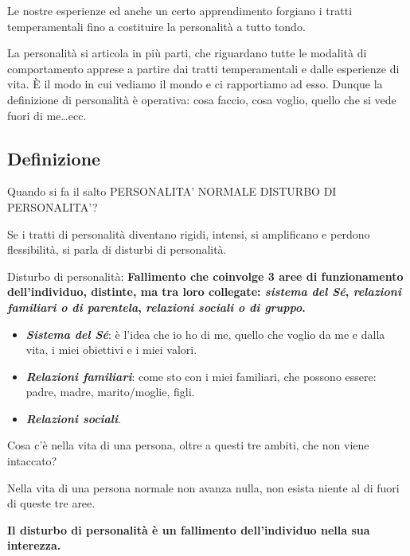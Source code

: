 Le nostre esperienze ed anche un certo apprendimento forgiano i tratti
temperamentali fino a costituire la personalità a tutto tondo.

La personalità si articola in più parti, che riguardano tutte le
modalità di comportamento apprese a partire dai tratti temperamentali e
dalle esperienze di vita. È il modo in cui vediamo il mondo e ci
rapportiamo ad esso. Dunque la definizione di personalità è operativa:
cosa faccio, cosa voglio, quello che si vede fuori di me\ldots{}ecc.

\subsection{Definizione}

Quando si fa il salto PERSONALITA' NORMALE DISTURBO DI PERSONALITA'?

Se i tratti di personalità diventano rigidi, intensi, si amplificano e
perdono flessibilità, si parla di disturbi di personalità.

Disturbo di personalità: \textbf{Fallimento che coinvolge 3 aree di
funzionamento dell'individuo, distinte, ma tra loro collegate:
\emph{sistema del Sé}, \emph{relazioni familiari o di parentela},
\emph{relazioni sociali o di gruppo}.}

\begin{itemize}
\item
  \emph{\textbf{Sistema del Sé}}: è l'idea che io ho di me, quello che
  voglio da me e dalla vita, i miei obiettivi e i miei valori.
\item
  \emph{\textbf{Relazioni familiari}}: come sto con i miei familiari,
  che possono essere: padre, madre, marito/moglie, figli.
\item
  \emph{\textbf{Relazioni sociali}}.
\end{itemize}

Cosa c'è nella vita di una persona, oltre a questi tre ambiti, che non
viene intaccato?

Nella vita di una persona normale non avanza nulla, non esista niente al
di fuori di queste tre aree.

\textbf{Il disturbo di personalità è un fallimento dell'individuo nella
sua interezza.}


